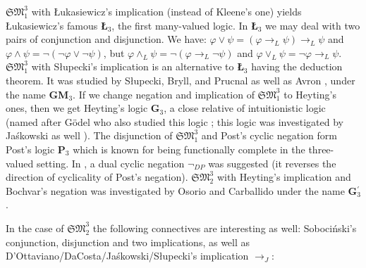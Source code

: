 \documentclass[10pt,a4paper]{article}
\theoremstyle{definition}
\newcommand{\3}{\vspace{.3in}}
\newcommand{\2}{\vspace{.2in}}
\newcommand{\1}{\vspace{.1in}}
\newcommand{\5}{\vspace{.05in}}
\begin{document}
$\mathfrak{SM}_1^3$ with \L ukasiewicz's implication (instead of Kleene's one) yields \L ukasiewicz's famous {\bf \L$_3$}, the first many-valued logic. In {\bf \L$_3$} we may deal with two pairs of conjunction and disjunction.  
We have: $ \varphi\vee\psi=(\varphi\rightarrow_L\psi)\rightarrow_L\psi $ and $\varphi\wedge\psi=\neg(\neg\varphi\vee\neg\psi)  $, but $  \varphi\wedge_L\psi=\neg(\varphi\rightarrow_L\neg \psi)$ and $ \varphi\vee_L\psi=\neg \varphi\rightarrow_L \psi$. $\mathfrak{SM}_1^3$ with S\l upecki's implication is an alternative to {\bf \L$_3$} having the deduction theorem. It was studied by S\l{}upecki, Bryll, and Prucnal \cite{Slupecki67} as well as Avron  \cite{Avron}, under the name {\bf GM$_3$}. If we change negation and implication of $\mathfrak{SM}_1^3$ to Heyting's ones, then we get Heyting's \cite{Heyting} logic {\bf G$_3$}, a close relative of intuitionistic logic (named after G\"{o}del who also studied this logic \cite{Godel}; this logic was investigated by Ja\'{s}kowski as well \cite{Jaskowski}). 
The disjunction of $\mathfrak{SM}_1^3$ and Post's cyclic negation form Post's logic {\bf P$_3$} \cite{Post21} which is known for being functionally complete in the three-valued setting. In \cite{PetrukhinP}, a dual cyclic negation $ \neg_{\mathit{DP}} $ was suggested (it reverses the direction of cyclicality of Post's negation). $\mathfrak{SM}_2^3$ with Heyting's implication and Bochvar's negation was investigated by Osorio and Carballido \cite{OsorioCarballido08} under the name {\bf G}$_3^\prime$. 

In the case of $\mathfrak{SM}_2^3$ the following connectives are interesting as well: Soboci\'nski's \cite{Sobocinski} conjunction, disjunction and two implications, as well as D'Ottaviano/DaCosta/Ja\'{s}kowski/S\l{}upecki's \cite{DOttavianodaCosta,Jaskowski48,Slupecki39} implication $\rightarrow_J$:
\end{document}
